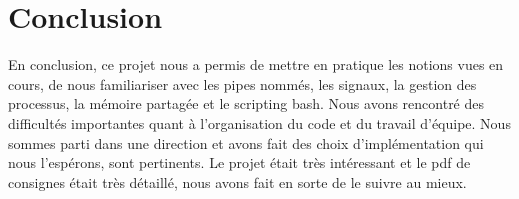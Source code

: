 \documentclass{article}
\begin{document}
\section{Conclusion}
\label{conclusion}

En conclusion, ce projet nous a permis de mettre en pratique les notions vues en cours, de nous familiariser avec les pipes nommés, les signaux, la gestion des processus, la mémoire partagée et le scripting bash.
Nous avons rencontré des difficultés importantes quant à l'organisation du code et du travail d'équipe. Nous sommes parti dans une direction et avons fait des choix d'implémentation qui nous l'espérons, sont pertinents.
Le projet était très intéressant et le pdf de consignes était très détaillé, nous avons fait en sorte de le suivre au mieux.
\end{document}
